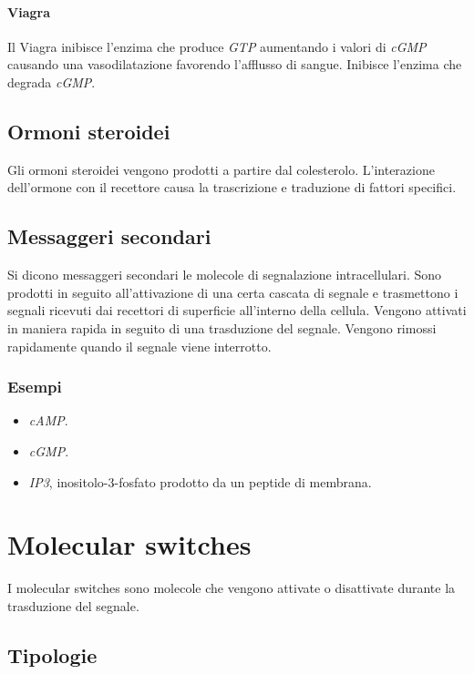 			\paragraph{Viagra}
			Il Viagra inibisce l'enzima che produce \emph{GTP} aumentando i valori di \emph{cGMP} causando una vasodilatazione favorendo l'afflusso di sangue.
			Inibisce l'enzima che degrada \emph{cGMP}.

	\subsection{Ormoni steroidei}
	Gli ormoni steroidei vengono prodotti a partire dal colesterolo.
	L'interazione dell'ormone con il recettore causa la trascrizione e traduzione di fattori specifici.

	\subsection{Messaggeri secondari}
	Si dicono messaggeri secondari le molecole di segnalazione intracellulari.
	Sono prodotti in seguito all'attivazione di una certa cascata di segnale e trasmettono i segnali ricevuti dai recettori di superficie all'interno della cellula.
	Vengono attivati in maniera rapida in seguito di una trasduzione del segnale.
	Vengono rimossi rapidamente quando il segnale viene interrotto.

		\subsubsection{Esempi}
		\begin{multicols}{2}
			\begin{itemize}
				\item \emph{cAMP}.
				\item \emph{cGMP}.
				\item \emph{IP3}, inositolo-3-fosfato prodotto da un peptide di membrana.
			\end{itemize}
		\end{multicols}

\section{Molecular switches}
I molecular switches sono molecole che vengono attivate o disattivate durante la trasduzione del segnale.

	\subsection{Tipologie}

